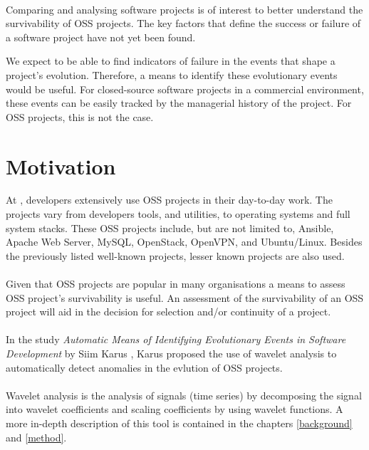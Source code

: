 \paragraph{}
Comparing and analysing software projects is of interest to better understand
the survivability of OSS projects. The key factors that define the success or
failure of a software project have not yet been found.

We expect to be able to find indicators of failure in the events that
shape a project's evolution. Therefore, a means to identify these evolutionary
events would be useful. For closed-source software projects in a commercial
environment, these events can be easily tracked by the managerial history of
the project. For OSS projects, this is not the case.



\section{Motivation}
At \hostOrg, developers extensively use OSS projects in their day-to-day
work. The projects vary from developers tools, and utilities, to operating
systems and full system stacks. These OSS projects include, but are not limited
to, Ansible, Apache Web Server, MySQL, OpenStack, OpenVPN, and Ubuntu/Linux.
Besides the previously listed well-known projects, lesser known projects are
also used.

\paragraph{}
Given that OSS projects are popular in many organisations a means to assess OSS
project's survivability is useful. An assessment of the survivability of an OSS
project will aid in the decision for selection and/or continuity of a project.

\paragraph{}
In the study \emph{Automatic Means of Identifying Evolutionary Events in
Software Development }\rm by Siim Karus \cite{karus2013}, Karus proposed the
use of wavelet analysis to automatically detect anomalies in the evlution of
OSS projects.

\paragraph{}
Wavelet analysis is the analysis of signals (time series) by decomposing the
signal into wavelet coefficients and scaling coefficients by using wavelet
functions. A more in-depth description of this tool is contained in the chapters
\ref{background} and \ref{method}.

